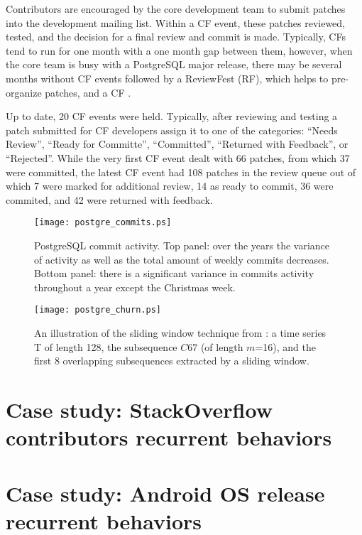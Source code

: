 Contributors are encouraged by the core development team to submit patches into the development mailing list. Within a CF event, 
these patches reviewed, tested, and the decision for a final review and commit is made.  Typically, CFs tend to run for one month 
with a one month gap between them, however, when the core team is busy with a PostgreSQL major release, there may be several 
months without CF events followed by a ReviewFest (RF), which helps to pre-organize patches, and a CF . 

Up to date, 20 CF events were held. Typically, after reviewing and testing a patch submitted for CF developers assign it to one of the 
categories: ``Needs Review'', ``Ready for Committe'', ``Committed'', ``Returned with Feedback'', or ``Rejected''. 
While the very first CF event dealt with 66 patches, from which 37 were committed, the latest CF event had 108 patches in the review 
queue out of which 7 were marked for additional review, 14 as ready to commit, 36 were commited, and 42 were returned with feedback.

\begin{figure}[h]
   \centering
   \texttt{[image: postgre\_commits.ps]}
   \caption{PostgreSQL commit activity. Top panel: over the years the variance of activity as well as the total amount of weekly commits decreases.
   Bottom panel: there is a significant variance in commits activity throughout a year except the Christmas week.}
   \label{fig:sliding_window}
\end{figure}

\begin{figure}[h]
   \centering
   \texttt{[image: postgre\_churn.ps]}
   \caption{An illustration of the sliding window technique from \cite{citeulike:2821475}: a time series T of length 128, 
   the subsequence $C67$ (of length $m$=16), and the first 8 overlapping subsequences extracted by a sliding window.}
   \label{fig:sliding_window}
\end{figure}



\section{Case study: StackOverflow contributors recurrent behaviors}
\section{Case study: Android OS release recurrent behaviors}
